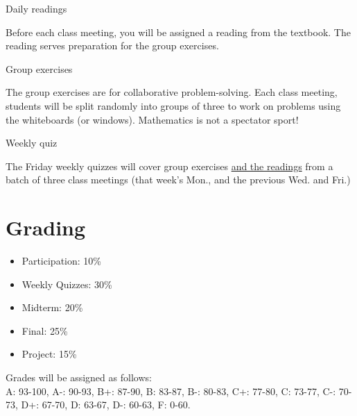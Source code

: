 \documentclass[letterpaper]{inzane_syllabus} %
\begin{document}

\vspace{0.1cm} 

{\color{myCOLOR} Daily readings}

Before each class meeting, you will be assigned a reading from the textbook. The reading serves preparation for the group exercises. %


{\color{myCOLOR} Group exercises}

The group exercises are for collaborative problem-solving.  Each class meeting, students will be split randomly into groups of three to work on problems using the whiteboards (or windows). Mathematics is not a spectator sport!



{\color{myCOLOR} Weekly quiz}

The Friday weekly quizzes will cover group exercises \underline{and the readings} from a batch of three class meetings (that week's Mon., and the previous Wed. and Fri.) 



\newpage %

\makeSide %


\section{Grading}

\begin{itemize}
\item Participation: 10\% 
\item Weekly Quizzes: 30\%  
\item Midterm: 20\%
\item Final: 25\%
\item Project: 15\% 
\end{itemize}

Grades will be assigned as follows: \\
A: 93-100, A-: 90-93, B+: 87-90, B: 83-87, B-: 80-83, C+: 77-80, C: 73-77, C-: 70-73, D+: 67-70, D: 63-67, D-: 60-63, F: 0-60.
\end{document}
